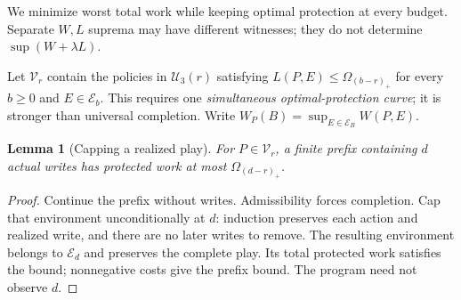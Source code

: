 \documentclass[acmsmall,screen,review,anonymous]{acmart}
\newtheorem{lemma}{Lemma}
\begin{document}
We minimize worst total work while keeping optimal protection at every budget. Separate $W,L$ suprema may have different witnesses; they do not determine $\sup(W+\lambda L)$.



Let $\mathcal V_r$ contain the policies in $\mathcal U_3(r)$ satisfying $L(P,E)\le\Omega_{(b-r)_+}$ for every $b\ge0$ and $E\in\mathcal E_b$. This requires one \emph{simultaneous optimal-protection curve}; it is stronger than universal completion. Write $W_P(B)=\sup_{E\in\mathcal E_B}W(P,E)$.

\begin{lemma}[Capping a realized play]
\label{lem:capping}
For $P\in\mathcal V_r$, a finite prefix containing $d$ actual writes has protected work at most $\Omega_{(d-r)_+}$.
\end{lemma}
\begin{proof}
Continue the prefix without writes. Admissibility forces completion. Cap that environment unconditionally at $d$: induction preserves each action and realized write, and there are no later writes to remove. The resulting environment belongs to $\mathcal E_d$ and preserves the complete play. Its total protected work satisfies the bound; nonnegative costs give the prefix bound. The program need not observe $d$.
\end{proof}
\end{document}
